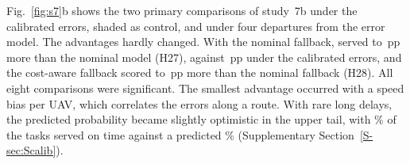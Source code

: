 Fig.~\ref{fig:s7}b shows the two primary comparisons of study~7b under the calibrated errors, shaded as control, and
under four departures from the error model. The advantages hardly changed. With the nominal fallback, \mname{} served
 to \,pp more than the nominal model (H27), against
\,pp under the calibrated errors, and the cost-aware fallback scored  to
\,pp more than the nominal fallback (H28). All eight comparisons were significant. The
smallest advantage occurred with a speed bias per UAV, which correlates the errors along a route. With rare long
delays, the predicted probability became slightly optimistic in the upper tail, with \% of the
tasks served on time against a predicted \% (Supplementary Section~\ref{S-sec:Scalib}).
